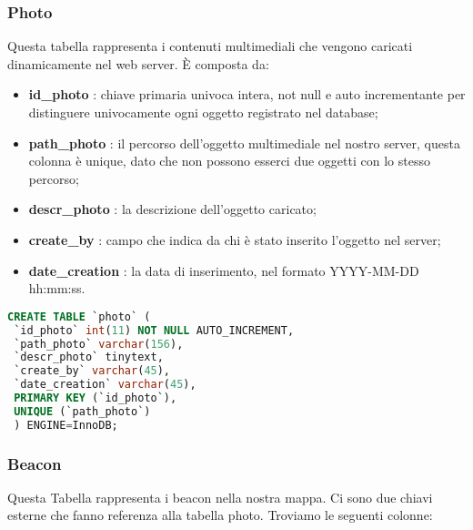 \subsubsection{Photo}


Questa tabella rappresenta i contenuti multimediali che vengono caricati dinamicamente nel web server. \newline
È composta da:
\begin{itemize}
\item \textbf{id\_photo} : chiave primaria univoca intera, not null e auto incrementante per distinguere univocamente ogni oggetto registrato nel database;

\item \textbf{path\_photo} : il percorso dell'oggetto multimediale nel nostro server, questa colonna è unique, dato che non possono esserci due oggetti con lo stesso percorso;

\item \textbf{descr\_photo} : la descrizione dell'oggetto caricato;

\item \textbf{create\_by} : campo che indica da chi è stato inserito l'oggetto nel server;

\item \textbf{date\_creation} : la data di inserimento, nel formato YYYY-MM-DD hh:mm:ss.
\end{itemize}
 
 \begin{lstlisting}[language=SQL, caption=Codice SQL della Tabella Photos]
 CREATE TABLE `photo` (
 `id_photo` int(11) NOT NULL AUTO_INCREMENT,
 `path_photo` varchar(156),
 `descr_photo` tinytext, 
 `create_by` varchar(45),
 `date_creation` varchar(45),
 PRIMARY KEY (`id_photo`),
 UNIQUE (`path_photo`)
 ) ENGINE=InnoDB;
 \end{lstlisting}
 
\subsubsection{Beacon}

Questa Tabella rappresenta i beacon nella nostra mappa.
Ci sono due chiavi esterne che fanno referenza alla tabella photo.
\newline Troviamo le seguenti colonne:

